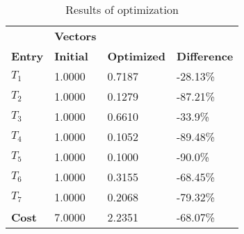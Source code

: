 \begin{table}[H]
\centering
\begin{tabular}{llll}
\textbf{}      & \cellcolor[HTML]{EFEFEF}\textbf{Vectors} & \textbf{} & \textbf{}         \\
\rowcolor[HTML]{EFEFEF} 
\textbf{Entry} & \textbf{Initial} & \textbf{Optimized} & \textbf{Difference} \\
$T_1$ & 1.0000 & 0.7187 & -28.13\% \\ 
$T_2$ & 1.0000 & 0.1279 & -87.21\% \\ 
$T_3$ & 1.0000 & 0.6610 & -33.9\% \\ 
$T_4$ & 1.0000 & 0.1052 & -89.48\% \\ 
$T_5$ & 1.0000 & 0.1000 & -90.0\% \\ 
$T_6$ & 1.0000 & 0.3155 & -68.45\% \\ 
$T_7$ & 1.0000 & 0.2068 & -79.32\% \\ 
\rowcolor[HTML]{EFEFEF} 
\textbf{Cost}  & 7.0000 & 2.2351 & -68.07\% \\ 
\end{tabular}
\caption{Results of optimization}
\label{tab:OptimizationAnalysis}
\end{table}